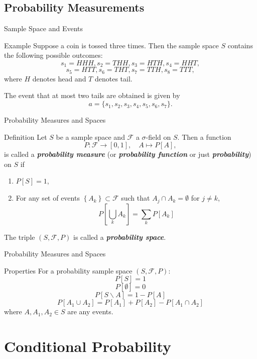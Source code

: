 \documentclass{beamer}
\newcommand{\bb}[1]{\textcolor{antiquefuchsia}{\textbf{\textit{#1}}}}
\begin{document}
\subsection{Probability Measurements}
\begin{frame}{Sample Space and Events}
\begin{block}{Example}
Suppose a coin is tossed three times. Then the sample space $S$ contains the following possible outcomes:
$$s_1=HHH,s_2=THH,s_3=HTH,s_4=HHT,$$
$$s_5=HTT,s_6=THT,s_7=TTH,s_8=TTT,$$
where $H$ denotes head and $T$ denotes tail.
\end{block}
The event that at most
two tails are obtained is given by
$$a=\{s_1,s_2,s_3,s_4,s_5,s_6,s_7\}.$$
\end{frame}


\begin{frame}{Probability Measures and Spaces}
\begin{block}{Definition}
Let $S$ be a sample space and $\mathscr{F}$ a $\sigma$-field on $S$. Then a function
$$
P: \mathscr{F} \rightarrow[0,1], \quad A \mapsto P[A],
$$
is called a \bb{probability measure} (or \bb{probability function} or just \bb{probability}) on $S$ if
\begin{enumerate}
\item $P[S]=1$,
\item For any set of events $\left\{A_{k}\right\} \subset \mathscr{F}$ such that $A_{j} \cap A_{k}=\emptyset$ for $j \neq k$,
$$
P\left[\bigcup_{k} A_{k}\right]=\sum_{k} P\left[A_{k}\right]
$$
\end{enumerate}
The triple $(S, \mathscr{F}, P)$ is called a \bb{probability space}.
\end{block}
\end{frame}



\begin{frame}{Probability Measures and Spaces}
\begin{block}{Properties}
For a probability sample space $(S,\mathscr{F},P)$:
$$P[S]=1$$
$$P[\emptyset]=0$$
$$P[S \backslash A]=1-P[A]$$
$$P[A_{1} \cup A_{2}]=P[A_{1}]+P[A_{2}]-P[A_{1} \cap A_{2}]$$
where $A,A_1,A_2\in S$ are any events.
\end{block}
\end{frame}

\section{Conditional Probability}
\end{document}
